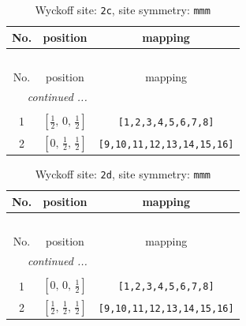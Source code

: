 \documentclass[fleqn,8pt]{jsarticle}
\begin{document}
\renewcommand{\arraystretch}{1.2}
\begin{longtable}{ccc}
\caption{Wyckoff site: {\tt 2c}, site symmetry: {\tt mmm}}
 \\
 \hline \hline
No. & position & mapping \\ \hline \endfirsthead

\multicolumn{2}{l}{\tablename\ \thetable{}} \\
 \hline \hline
No. & position & mapping \\ \hline \endhead

 \hline \hline
\multicolumn{2}{r}{\footnotesize\it continued ...} \\ \endfoot

 \hline \hline
\multicolumn{2}{r}{} \\ \endlastfoot

1 & $\left[ \frac{1}{2},\, 0,\, \frac{1}{2} \right]$ & {\tt [1,2,3,4,5,6,7,8]} \\ \hline
2 & $\left[ 0,\, \frac{1}{2},\, \frac{1}{2} \right]$ & {\tt [9,10,11,12,13,14,15,16]} \\
\end{longtable}
\renewcommand{\arraystretch}{1.2}
\begin{longtable}{ccc}
\caption{Wyckoff site: {\tt 2d}, site symmetry: {\tt mmm}}
 \\
 \hline \hline
No. & position & mapping \\ \hline \endfirsthead

\multicolumn{2}{l}{\tablename\ \thetable{}} \\
 \hline \hline
No. & position & mapping \\ \hline \endhead

 \hline \hline
\multicolumn{2}{r}{\footnotesize\it continued ...} \\ \endfoot

 \hline \hline
\multicolumn{2}{r}{} \\ \endlastfoot

1 & $\left[ 0,\, 0,\, \frac{1}{2} \right]$ & {\tt [1,2,3,4,5,6,7,8]} \\ \hline
2 & $\left[ \frac{1}{2},\, \frac{1}{2},\, \frac{1}{2} \right]$ & {\tt [9,10,11,12,13,14,15,16]} \\
\end{longtable}
\renewcommand{\arraystretch}{1.2}
\end{document}
